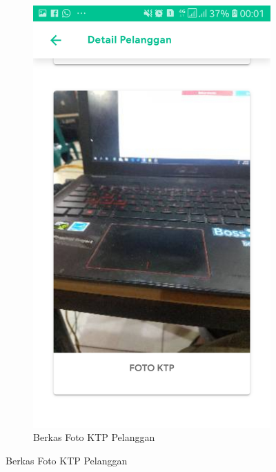 \begin{figure}[H]
\begin{subfigure}[b]{0.43\linewidth}
			\includegraphics [width = \linewidth]{gambar/android/foto-ktp}
			\caption{Berkas Foto KTP Pelanggan}
		\end{subfigure}
	\end{figure}

